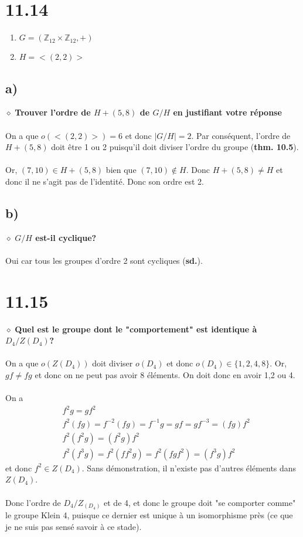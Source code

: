 \documentclass[a4paper,10pt]{article}
\begin{document}
\section*{11.14}
\begin{enumerate}
	\item $G = (\mathbb{Z}_{12} \times \mathbb{Z}_{12}, +)$
	\item $H = <(2,2)>$
\end{enumerate} 
\subsection*{a)}
$\diamond$ \textbf{Trouver l'ordre de $H + (5,8)$ de $G/H$ en justifiant votre réponse}
\\
\\
On a que $o(<(2,2)>) = 6$ et donc $|G/H| = 2$. Par conséquent, l'ordre de $H + (5,8)$ doit être 1 ou 2 puisqu'il doit diviser l'ordre du groupe (\textbf{thm. 10.5}). 
\\
\\
Or, $(7,10) \in H + (5,8)$ bien que $(7,10) \not \in H$. Donc $H + (5,8) \not = H$ et donc il ne s'agit pas de l'identité. Donc son ordre est 2.
\subsection*{b)}
$\diamond$ \textbf{$G/H$ est-il cyclique?}
\\
\\
Oui car tous les groupes d'ordre 2 sont cycliques (\textbf{sd.}).

\section*{11.15}
$\diamond$ \textbf{Quel est le groupe dont le "comportement" est identique à $D_4/Z(D_4)$?}
\\
\\
On a que $o(Z(D_4))$ doit diviser $o(D_4)$ et donc $o(D_4) \in \{1,2,4,8\}$. Or, $gf \neq fg$ et donc on ne peut pas avoir 8 éléments. On doit donc en avoir 1,2 ou 4.
\\
\\
On a 
\begin{align*}
	& f^2g = g f^2 \\
	& f^2 (fg) = f^{-2} (fg) = f^{-1} g = gf = gf^{-3} = (fg)f^2 \\
	& f^2 (f^2 g) = (f^2g)f^2 \\
	& f^2 (f^3 g) = f^2 (f f^2 g) = f^2 (fgf^2) = (f^3 g)f^2		
\end{align*} 
et donc $f^2 \in Z(D_4)$. Sans démonstration, il n'existe pas d'autres éléments dans $Z(D_4)$. 
\\
\\
Donc l'ordre de $D_4 / Z_(D_4)$ et de 4, et donc le groupe doit "se comporter comme" le groupe Klein 4, puisque ce dernier est unique à un isomorphisme près (ce que je ne suis pas sensé savoir à ce stade).
\end{document}
